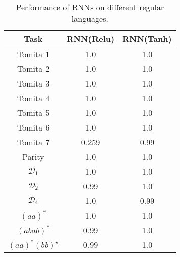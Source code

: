 \begin{center}
\begin{table}[!ht]
\centering
\begin{tabular}{|| c | c | c ||} 
 \hline
 Task & RNN(Relu) & RNN(Tanh)  \\ [0.5ex] 
 \hline\hline
 Tomita 1 & 1.0 & 1.0 \\
 Tomita 2 & 1.0 & 1.0 \\
 Tomita 3 & 1.0 & 1.0 \\
 Tomita 4 & 1.0 & 1.0 \\
 Tomita 5 & 1.0 & 1.0\\
 Tomita 6 & 1.0 & 1.0\\
 Tomita 7 & 0.259 & 0.99\\
 Parity & 1.0 & 1.0\\
 $\mathcal{D}_1$ & 1.0 & 1.0 \\
 $\mathcal{D}_2$ & 0.99 & 1.0\\
 $\mathcal{D}_4$ & 1.0 & 0.99\\
 $(aa)^{\ast}$ & 1.0 & 1.0\\
 $(abab)^{\ast}$ & 0.99 & 1.0 \\
 $(aa)^{\ast}(bb)^{\star}$ & 0.99 & 1.0 
 \\[1ex]
 \hline
\end{tabular}
\caption{Performance of RNNs on different regular languages.}
\label{table:regular}
\end{table}
\end{center}
\fi
